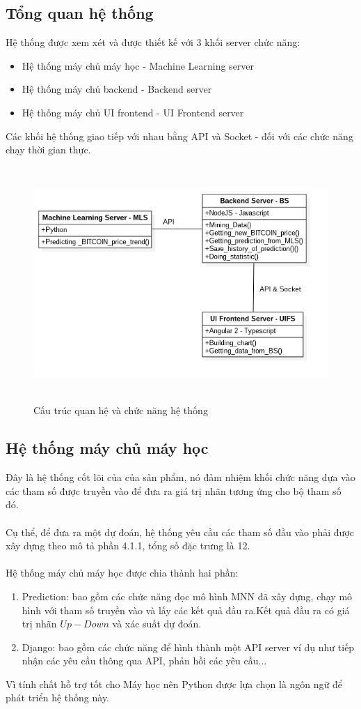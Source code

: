 \subsection{Tổng quan hệ thống}
Hệ thống được xem xét và được thiết kế với 3 khối server chức năng:
\begin{itemize}
\item Hệ thống máy chủ máy học - Machine Learning server
\item Hệ thống máy chủ backend - Backend server
\item Hệ thống máy chủ UI frontend - UI Frontend server
\end{itemize}
Các khối hệ thống giao tiếp với nhau bằng API và Socket - đối với các chức năng
chạy thời gian thực.\\
\begin{figure}[h!]
\centering
\includegraphics[height=3.5in, keepaspectratio=true]{system.png}
\caption{Cấu trúc quan hệ và chức năng hệ thống}
\end{figure}
\subsection{Hệ thống máy chủ máy học}
Đây là hệ thống cốt lõi của của sản phẩm, nó đảm nhiệm khối chức năng dựa vào 
các tham số được truyền vào để đưa ra giá trị nhãn tương ứng cho bộ tham số 
đó.\\\\
Cụ thể, để đưa ra một dự đoán, hệ thống yêu cầu các tham số đầu vào phải được 
xây dựng theo mô tả phần 4.1.1, tổng số đặc trưng là 12.\\\\
Hệ thống máy chủ máy học được chia thành hai phần:\\
\begin{enumerate}
\item Prediction: bao gồm các chức năng đọc mô hình MNN đã xây dựng, chạy mô 
hình với tham số truyền vào và lấy các kết quả đầu ra.Kết quả đầu ra có giá 
trị nhãn $Up-Down$ và xác suất dự đoán.
\item Django: bao gồm các chức năng để hình thành một API server ví dụ như 
tiếp nhận các yêu cầu thông qua API, phản hồi các yêu cầu...
\end{enumerate}
Vì tính chất hỗ trợ tốt cho Máy học nên Python được lựa chọn là ngôn 
ngữ để phát triển hệ thống này.
